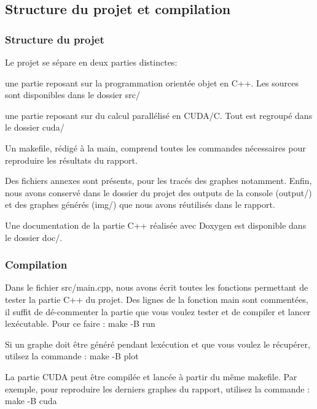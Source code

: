 \subsection*{Structure du projet et compilation}

\subsubsection*{Structure du projet}

Le projet se sépare en deux parties distinctes\+:
\begin{DoxyItemize}
\item une partie reposant sur la programmation orientée objet en C++. Les sources sont disponibles dans le dossier src/
\item une partie reposant sur du calcul parallélisé en C\+U\+D\+A/C. Tout est regroupé dans le dossier cuda/
\end{DoxyItemize}

Un makefile, rédigé à la main, comprend toutes les commandes nécessaires pour reproduire les résultats du rapport.

Des fichiers annexes sont présents, pour les tracés des graphes notamment. Enfin, nous avons conservé dans le dossier du projet des outputs de la console (output/) et des graphes générés (img/) que nous avons réutilisés dans le rapport.

Une documentation de la partie C++ réalisée avec Doxygen est disponible dans le dossier doc/.

\subsubsection*{Compilation}

Dans le fichier src/main.\+cpp, nous avons écrit toutes les fonctions permettant de tester la partie C++ du projet. Des lignes de la fonction main sont commentées, il suffit de dé-\/commenter la partie que vous voulez tester et de compiler et lancer l\textquotesingle{}exécutable. Pour ce faire \+: \textquotesingle{}\textquotesingle{}\textquotesingle{} make -\/B run \textquotesingle{}\textquotesingle{}\textquotesingle{}

Si un graphe doit être généré pendant l\textquotesingle{}exécution et que vous voulez le récupérer, utilsez la commande \+: \textquotesingle{}\textquotesingle{}\textquotesingle{} make -\/B plot \textquotesingle{}\textquotesingle{}\textquotesingle{}

La partie C\+U\+DA peut être compilée et lancée à partir du même makefile. Par exemple, pour reproduire les derniers graphes du rapport, utilisez la commande \+: \textquotesingle{}\textquotesingle{}\textquotesingle{} make -\/B cuda \textquotesingle{}\textquotesingle{}\textquotesingle{}

